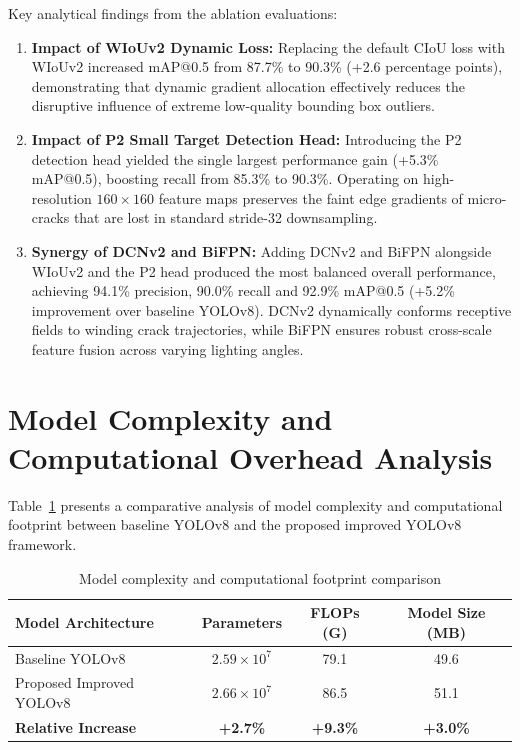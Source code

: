 \documentclass[12pt,a4paper]{report}
\begin{document}
Key analytical findings from the ablation evaluations:
\begin{enumerate}[label=\arabic*.]
    \item \textbf{Impact of WIoUv2 Dynamic Loss:} Replacing the default CIoU loss with WIoUv2 increased mAP@0.5 from 87.7\% to 90.3\% (+2.6 percentage points), demonstrating that dynamic gradient allocation effectively reduces the disruptive influence of extreme low-quality bounding box outliers.
    \item \textbf{Impact of P2 Small Target Detection Head:} Introducing the P2 detection head yielded the single largest performance gain (+5.3\% mAP@0.5), boosting recall from 85.3\% to 90.3\%. Operating on high-resolution $160 \times 160$ feature maps preserves the faint edge gradients of micro-cracks that are lost in standard stride-32 downsampling.
    \item \textbf{Synergy of DCNv2 and BiFPN:} Adding DCNv2 and BiFPN alongside WIoUv2 and the P2 head produced the most balanced overall performance, achieving 94.1\% precision, 90.0\% recall and 92.9\% mAP@0.5 (+5.2\% improvement over baseline YOLOv8). DCNv2 dynamically conforms receptive fields to winding crack trajectories, while BiFPN ensures robust cross-scale feature fusion across varying lighting angles.
\end{enumerate}

\section{Model Complexity and Computational Overhead Analysis}

Table~\ref{tab:model_complexity} presents a comparative analysis of model complexity and computational footprint between baseline YOLOv8 and the proposed improved YOLOv8 framework.

\begin{table}[H]
\centering
\caption{Model complexity and computational footprint comparison}
\label{tab:model_complexity}
\vspace{0.2cm}
\setlength{\tabcolsep}{10pt}
\renewcommand{\arraystretch}{1.15}
\small
\begin{tabular}{|l|c|c|c|}
\hline
\textbf{Model Architecture} & \textbf{Parameters} & \textbf{FLOPs (G)} & \textbf{Model Size (MB)} \\
\hline
Baseline YOLOv8 & $2.59 \times 10^7$ & 79.1 & 49.6 \\
\hline
Proposed Improved YOLOv8 & $2.66 \times 10^7$ & 86.5 & 51.1 \\
\hline
\textbf{Relative Increase} & \textbf{+2.7\%} & \textbf{+9.3\%} & \textbf{+3.0\%} \\
\hline
\end{tabular}
\end{table}
\end{document}
